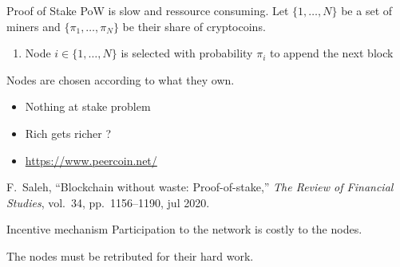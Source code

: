 \documentclass{beamer}
\begin{document}
\begin{frame}{Proof of Stake}
PoW is slow and ressource consuming. Let $\{1,\ldots, N\}$ be a set of miners and $\{\pi_1,\ldots, \pi_N\}$ be their share of cryptocoins.
\begin{tcolorbox}[enhanced,drop shadow, title=PoS]
\begin{enumerate}
\item Node $i\in \{1,\ldots, N\}$ is selected with probability $\pi_i$ to append the next block
\end{enumerate}
\end{tcolorbox}
\vspace{0.3cm}
Nodes are chosen according to what they own.
\begin{itemize}
  \item Nothing at stake problem
  \item Rich gets richer ? 
  \item \url{https://www.peercoin.net/}
\end{itemize}
\footnotesize{
\begin{thebibliography}{1}
F.~Saleh, ``Blockchain without waste: Proof-of-stake,'' {\em The Review of
  Financial Studies}, vol.~34, pp.~1156--1190, jul 2020.
\end{thebibliography}}
\end{frame}
\begin{frame}{Incentive mechanism}
Participation to the network is costly to the nodes.


\begin{tcolorbox}[enhanced,drop shadow, title= Native cryptocurrency]
The nodes must be retributed for their hard work.
\end{tcolorbox}

\end{frame}
\end{document}
